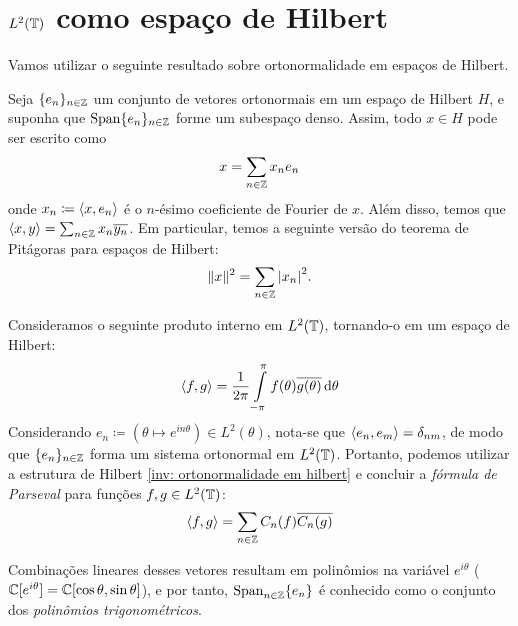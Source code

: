 \documentclass[../main.tex]{subfiles}
\begin{document}
\section{\texorpdfstring{$L^2(\mathbb T)$}{L2(T)} como espaço de Hilbert}
Vamos utilizar o seguinte resultado sobre ortonormalidade em espaços de Hilbert.
\begin{invocacao}
    \label{inv: ortonormalidade em hilbert}
    Seja $\{e_n\}_{n\in \operatorname{\mathbb{Z}}}$ um conjunto de vetores ortonormais em um espaço de Hilbert $H$, e suponha que $\operatorname{Span} \{e_n\}_{n\in \operatorname{\mathbb{Z}}}$ forme um subespaço denso. Assim, todo $x\in H$ pode ser escrito como
    \begin{equation*}
        x = \sum_{n\in\operatorname{\mathbb{Z}}} x_n e_n
    \end{equation*}
    onde $x_n \coloneqq \langle {x},{e_n}\rangle$ é o $n$-ésimo coeficiente de Fourier de $x$. Além disso, temos que $\langle {x},{y}\rangle = \sum_{n\in \operatorname{\mathbb{Z}}} x_n\overline{y_n}$. Em particular, temos a seguinte versão do teorema de Pitágoras para espaços de Hilbert:
    \begin{equation*}
        \|x\|^2 = \sum_{n\in \operatorname{\mathbb{Z}}} {|x_n|}^2.
    \end{equation*}
\end{invocacao}

Consideramos o seguinte produto interno em $L^2(\mathbb T)$, tornando-o em um espaço de Hilbert:
\begin{equation*}
    \langle {f},{g}\rangle = \dfrac1{2\pi} \int\limits_{-\pi}^\pi f(\theta) \overline{g(\theta)}\,{\operatorname{d}}{\theta}
\end{equation*}
Considerando $e_n \coloneqq (\theta\longmapsto e^{in\theta}) \in L^2(\theta)$, nota-se que $\langle {e_n},{e_m}\rangle = \delta_{nm}$, de modo que $\{e_n\}_{n\in \operatorname{\mathbb{Z}}}$ forma um sistema ortonormal em $L^2(\mathbb T)$. Portanto, podemos utilizar a estrutura de Hilbert \ref{inv: ortonormalidade em hilbert} e concluir a \textit{fórmula de Parseval} para funções $f,g \in L^2(\mathbb T)$:
\begin{equation*}
    \langle {f},{g}\rangle = \sum_{n\in \operatorname{\mathbb{Z}}} C_n(f) \overline{C_n(g)}
\end{equation*}

Combinações lineares desses vetores resultam em polinômios na variável $e^{i\theta}$ ($\operatorname{\mathbb{C}}[e^{i\theta}] = \operatorname{\mathbb{C}}[\cos\theta, \sin\theta]$), e por tanto, $\operatorname{Span}_{n\in \operatorname{\mathbb{Z}}} \{e_n\}$ é conhecido como o conjunto dos \textit{polinômios trigonométricos}.
\end{document}
